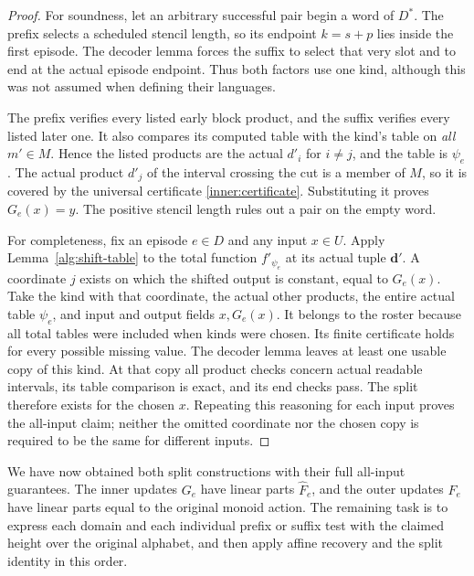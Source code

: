 \begin{proof}
For soundness, let an arbitrary successful pair begin a word of $D^*$.
The prefix selects a scheduled stencil length, so its endpoint $k=s+p$
lies inside the first episode. The decoder lemma forces the suffix to
select that very slot and to end at the actual episode endpoint. Thus
both factors use one kind, although this was not assumed when defining
their languages.

The prefix verifies every listed early block product, and the suffix
verifies every listed later one. It also compares its computed table
with the kind's table on \emph{all} $m'\in M$. Hence the listed products
are the actual $d'_i$ for $i\ne j$, and the table is $\psi_e$.
The actual product $d'_j$ of the interval crossing the cut is a member
of $M$, so it is covered by the universal certificate
\eqref{inner:certificate}. Substituting it proves $G_e(x)=y$.
The positive stencil length rules out a pair on the empty word.

For completeness, fix an episode $e\in D$ and any input $x\in U$.
Apply Lemma~\ref{alg:shift-table} to the total function
$f'_{\psi_e}$ at its actual tuple $\mathbf d'$. A coordinate $j$
exists on which the shifted output is constant, equal to $G_e(x)$.
Take the kind with that coordinate, the actual other products, the entire
actual table $\psi_e$, and input and output fields $x,G_e(x)$. It belongs
to the roster because all total tables were included when kinds were
chosen. Its finite certificate holds for every possible missing value.
The decoder lemma leaves at least one usable copy of this kind. At that
copy all product checks concern actual readable intervals, its table
comparison is exact, and its end checks pass. The split therefore exists
for the chosen $x$. Repeating this reasoning for each input proves the
all-input claim; neither the omitted coordinate nor the chosen copy is
required to be the same for different inputs.
\end{proof}

We have now obtained both split constructions with their full
all-input guarantees.  The inner updates $G_e$ have linear
parts $\widehat F_e$, and the outer updates $F_e$ have linear
parts equal to the original monoid action.  The remaining task
is to express each domain and each individual prefix or suffix
test with the claimed height over the original alphabet, and
then apply affine recovery and the split identity in this
order.
